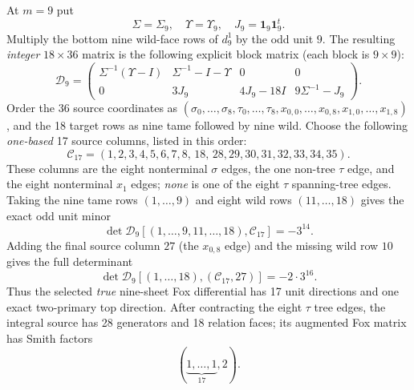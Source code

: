 \begin{corollary}
\label{cor:dyadic-f135-nine-minor-certificate}
At $m=9$ put
\[
\Sigma=\Sigma_9,\quad
\Upsilon=\Upsilon_9,\quad
J_9=\mathbf1_9\mathbf1_9^t.
\]
Multiply the bottom
nine wild-face
rows of $d_9^1$
by the odd unit
$9$.
The resulting
\emph{integer}
$18\times36$
matrix is the
following explicit
block matrix
(each block is
$9\times9$):
\begin{equation}\label{eq:dyadic-f135-nine-block-fox}
\boxed{
\mathscr D_9=
\begin{pmatrix}
\Sigma^{-1}(\Upsilon-I)&
 \Sigma^{-1}-I-\Upsilon&
 0&0\\
0&3J_9&
4J_9-18I&
9\Sigma^{-1}-J_9
\end{pmatrix}.
}
\end{equation}
Order the
36 source
coordinates as
$(\sigma_0,\ldots,\sigma_8,
\tau_0,\ldots,\tau_8,
x_{0,0},\ldots,x_{0,8},
x_{1,0},\ldots,x_{1,8})$,
and the
18 target rows
as nine tame
followed by
nine wild.
Choose the
following
\emph{one-based}
17 source columns,
listed in this order:
\begin{equation}\label{eq:dyadic-f135-nine-pivot-column-set}
\mathcal C_{17}=
(1,2,3,4,5,6,7,8,\,
18,\,
28,29,30,31,32,33,34,35).
\end{equation}
These columns
are the
eight nonterminal
$\sigma$ edges,
the one
non-tree $\tau$
edge, and
the eight
nonterminal
$x_1$ edges;
\emph{none}
is one of the
eight $\tau$
spanning-tree
edges.
Taking the nine
tame rows
$(1,\ldots,9)$
and eight
wild rows
$(11,\ldots,18)$
gives the
exact odd
unit minor
\begin{equation}\label{eq:dyadic-f135-nine-17minor}
\boxed{
\det\mathscr D_9[
(1,\ldots,9,11,\ldots,18),
\mathcal C_{17}]
=-3^{14}.
}
\end{equation}
Adding the final
source column
$27$ (the
$x_{0,8}$ edge)
and the missing
wild row $10$
gives the
full determinant
\begin{equation}\label{eq:dyadic-f135-nine-18minor}
\boxed{
\det\mathscr D_9[
(1,\ldots,18),
(\mathcal C_{17},27)]
=-2\cdot3^{16}.
}
\end{equation}
Thus the selected
\emph{true}
nine-sheet
Fox differential
has 17 unit
directions and
one exact
two-primary
top direction.
After contracting
the eight
$\tau$ tree edges,
the integral
source has
28 generators
and 18 relation
faces; its
augmented
Fox matrix
has Smith factors
\[
(\underbrace{1,\ldots,1}_{17},2).
\]
\end{corollary}

